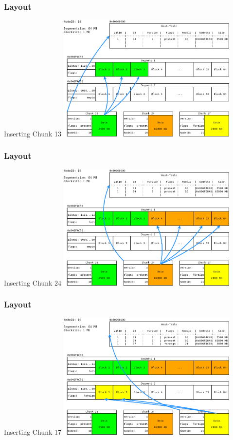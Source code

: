 \documentclass{beamer}
\begin{document}
	\begin{frame}
		\frametitle{Layout}

		\begin{block}{Inserting Chunk 13}
			\center\includegraphics[width=9cm]{./img/Log_Layout_01}
		\end{block}
	\end{frame}

	\begin{frame}
		\frametitle{Layout}

		\begin{block}{Inserting Chunk 24}
			\center\includegraphics[width=9cm]{./img/Log_Layout_02}
		\end{block}
	\end{frame}

	\begin{frame}
		\frametitle{Layout}

		\begin{block}{Inserting Chunk 17}
			\center\includegraphics[width=9cm]{./img/Log_Layout_03}
		\end{block}
	\end{frame}
\end{document}
